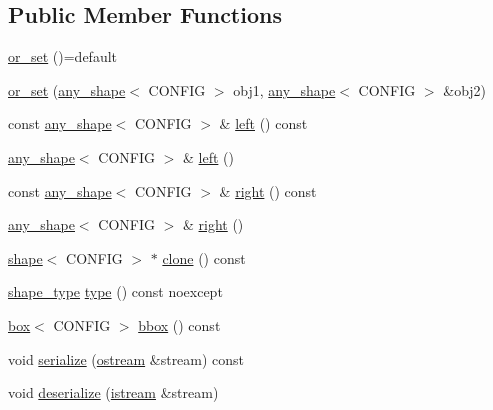 \subsection*{Public Member Functions}
\begin{DoxyCompactItemize}
\item 
\hyperlink{classmui_1_1geometry_1_1or__set_abe2bca43b4f0f8ab5f303110e0e3cee9}{or\+\_\+set} ()=default
\item 
\hyperlink{classmui_1_1geometry_1_1or__set_af7cc1f5c494421966a751692afc3e4dc}{or\+\_\+set} (\hyperlink{classmui_1_1geometry_1_1any__shape}{any\+\_\+shape}$<$ C\+O\+N\+F\+IG $>$ obj1, \hyperlink{classmui_1_1geometry_1_1any__shape}{any\+\_\+shape}$<$ C\+O\+N\+F\+IG $>$ \&obj2)
\item 
const \hyperlink{classmui_1_1geometry_1_1any__shape}{any\+\_\+shape}$<$ C\+O\+N\+F\+IG $>$ \& \hyperlink{classmui_1_1geometry_1_1or__set_a143434f556a636e3c8ea7bc71cca5286}{left} () const
\item 
\hyperlink{classmui_1_1geometry_1_1any__shape}{any\+\_\+shape}$<$ C\+O\+N\+F\+IG $>$ \& \hyperlink{classmui_1_1geometry_1_1or__set_a7bd5c9d4fbf04d0ad98ea2422cb94bfe}{left} ()
\item 
const \hyperlink{classmui_1_1geometry_1_1any__shape}{any\+\_\+shape}$<$ C\+O\+N\+F\+IG $>$ \& \hyperlink{classmui_1_1geometry_1_1or__set_acb22c551a32b377ae7169d311a29eaa8}{right} () const
\item 
\hyperlink{classmui_1_1geometry_1_1any__shape}{any\+\_\+shape}$<$ C\+O\+N\+F\+IG $>$ \& \hyperlink{classmui_1_1geometry_1_1or__set_a6eb0ff8df7bb78b4234afca52f68889b}{right} ()
\item 
\hyperlink{classmui_1_1geometry_1_1shape}{shape}$<$ C\+O\+N\+F\+IG $>$ $\ast$ \hyperlink{classmui_1_1geometry_1_1or__set_a265ef0385d0822f3222e0ef669eb4fc5}{clone} () const
\item 
\hyperlink{namespacemui_1_1geometry_a5f311a343181e2f20482e5c9afb0f136}{shape\+\_\+type} \hyperlink{classmui_1_1geometry_1_1or__set_a1cb6c72bb7be1fca6ccd038cf6d6946e}{type} () const noexcept
\item 
\hyperlink{classmui_1_1geometry_1_1box}{box}$<$ C\+O\+N\+F\+IG $>$ \hyperlink{classmui_1_1geometry_1_1or__set_ac5789620d2af6810d8f7c02d5190429f}{bbox} () const
\item 
void \hyperlink{classmui_1_1geometry_1_1or__set_ae761a2812fb9749e7df978a50b72cd76}{serialize} (\hyperlink{classmui_1_1ostream}{ostream} \&stream) const
\item 
void \hyperlink{classmui_1_1geometry_1_1or__set_ad08aaf634078ee8407ab86de77576391}{deserialize} (\hyperlink{classmui_1_1istream}{istream} \&stream)
\end{DoxyCompactItemize}
